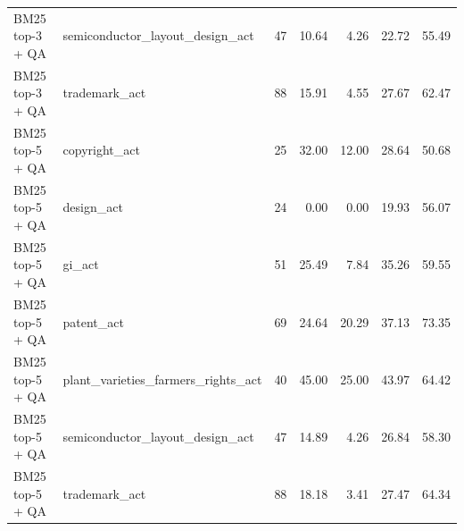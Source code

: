 \begin{table}[htbp]
\begin{tabular}{llrrrrr}
BM25 top-3 + QA & semiconductor\_layout\_design\_act & 47 & 10.64 & 4.26 & 22.72 & 55.49 \\
BM25 top-3 + QA & trademark\_act & 88 & 15.91 & 4.55 & 27.67 & 62.47 \\
BM25 top-5 + QA & copyright\_act & 25 & 32.00 & 12.00 & 28.64 & 50.68 \\
BM25 top-5 + QA & design\_act & 24 & 0.00 & 0.00 & 19.93 & 56.07 \\
BM25 top-5 + QA & gi\_act & 51 & 25.49 & 7.84 & 35.26 & 59.55 \\
BM25 top-5 + QA & patent\_act & 69 & 24.64 & 20.29 & 37.13 & 73.35 \\
BM25 top-5 + QA & plant\_varieties\_farmers\_rights\_act & 40 & 45.00 & 25.00 & 43.97 & 64.42 \\
BM25 top-5 + QA & semiconductor\_layout\_design\_act & 47 & 14.89 & 4.26 & 26.84 & 58.30 \\
BM25 top-5 + QA & trademark\_act & 88 & 18.18 & 3.41 & 27.47 & 64.34 \\
\bottomrule
\end{tabular}
\end{table}
